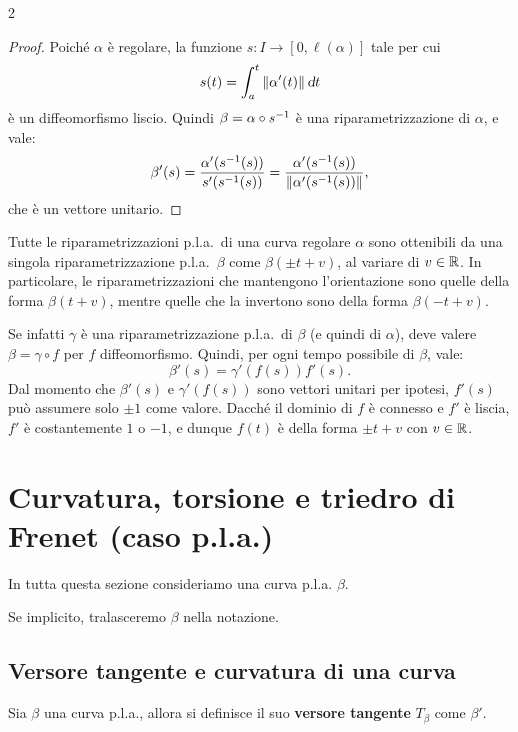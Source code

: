 \begin{multicols*}{2}
    \begin{proof}
        Poiché $\alpha$ è regolare, la funzione $s : I \to [0, \ell(\alpha)]$ tale per cui
        \[ s(t) = \int_{a}^t \norm{\alpha'(t)} \dt \]
        è un diffeomorfismo liscio. Quindi $\beta = \alpha \circ s^{-1}$ è una riparametrizzazione
        di $\alpha$, e vale:
        \[
            \beta'(s) = \frac{\alpha'(s^{-1}(s))}{s'(s^{-1}(s))} = \frac{\alpha'(s^{-1}(s))}{\left\lVert \alpha'(s^{-1}(s)) \right\rVert},
        \]
        che è un vettore unitario.
    \end{proof}

    \begin{remark}
        Tutte le riparametrizzazioni p.l.a.~di una curva regolare $\alpha$ sono ottenibili da una
        singola riparametrizzazione p.l.a.~$\beta$ come $\beta(\pm t + v)$, al variare di $v \in \mathbb{R}$.
        In particolare, le riparametrizzazioni che mantengono l'orientazione sono quelle della forma
        $\beta(t + v)$, mentre quelle che la invertono sono della forma $\beta(-t + v)$. \medskip

        Se infatti $\gamma$ è una riparametrizzazione p.l.a.~di $\beta$ (e quindi di $\alpha$), deve valere
        $\beta = \gamma \circ f$ per $f$ diffeomorfismo. Quindi, per ogni tempo possibile di $\beta$, vale:
        \[ \beta'(s) = \gamma'(f(s)) f'(s). \]
        Dal momento che $\beta'(s)$ e $\gamma'(f(s))$ sono vettori unitari per ipotesi, $f'(s)$ può assumere
        solo $\pm 1$ come valore.
        Dacché il dominio di $f$ è connesso e $f'$ è liscia, $f'$ è costantemente $1$ o $-1$, e dunque
        $f(t)$ è della forma $\pm t + v$ con $v \in \mathbb{R}$.
    \end{remark}

    \section{Curvatura, torsione e triedro di Frenet (caso p.l.a.)}

    In tutta questa sezione consideriamo una curva p.l.a. $\beta$. \smallskip

    Se implicito, tralasceremo $\beta$ nella notazione.

    \subsection{Versore tangente e curvatura di una curva}

    \begin{definition}
        Sia $\beta$ una curva p.l.a., allora si definisce il
        suo \textbf{versore tangente} $T_\beta$ come $\beta'$.
    \end{definition}


\end{multicols*}
